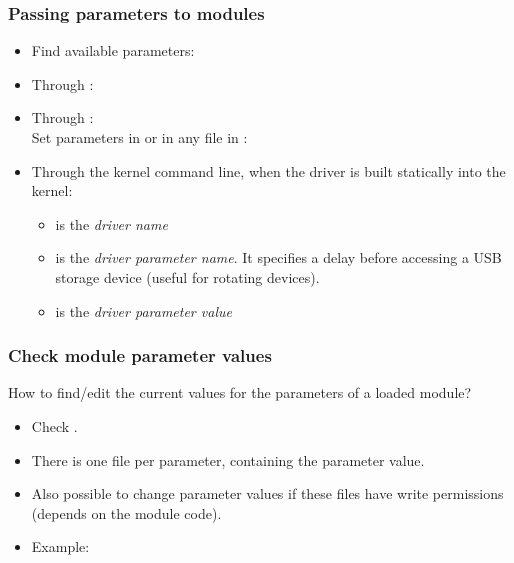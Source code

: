 \begin{frame}
  \frametitle{Passing parameters to modules}
  \begin{itemize}
  \item Find available parameters:\\
  \item Through :\\
  \item Through :\\
    Set parameters in  or in any file in :\\
  \item Through the kernel command line, when the driver is built statically into the kernel:\\
    \begin{itemize}
    \item {} is the {\em driver name}
    \item {} is the {\em driver parameter name}. It
      specifies a delay before accessing a USB storage device (useful for
      rotating devices).
    \item {} is the {\em driver parameter value}
    \end{itemize}
  \end{itemize}
\end{frame}

\begin{frame}
  \frametitle{Check module parameter values}
  How to find/edit the current values for the parameters of a loaded module?
  \begin{itemize}
  \item Check .
  \item There is one file per parameter, containing the parameter value.
  \item Also possible to change parameter values if these files have
        write permissions (depends on the module code).
  \item Example:\\
  \end{itemize}
\end{frame}
